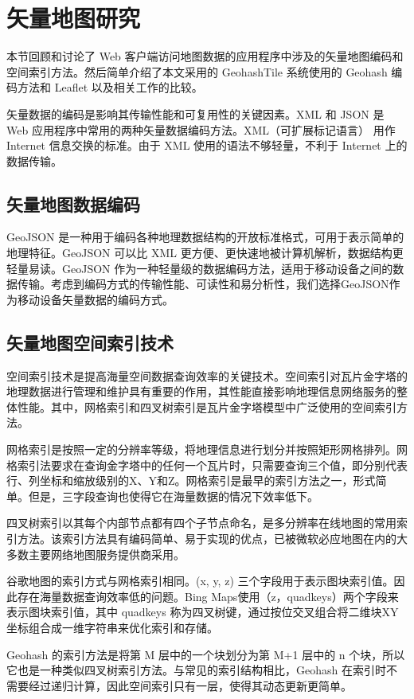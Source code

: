 \section{矢量地图研究}
本节回顾和讨论了 Web 客户端访问地图数据的应用程序中涉及的矢量地图编码和空间索引方法。然后简单介绍了本文采用的 GeohashTile 系统使用的 Geohash 编码方法和 Leaflet 以及相关工作的比较。

矢量数据的编码是影响其传输性能和可复用性的关键因素。XML 和 JSON 是 Web 应用程序中常用的两种矢量数据编码方法。XML（可扩展标记语言） 用作 Internet 信息交换的标准。由于 XML 使用的语法不够轻量，不利于 Internet 上的数据传输。\par
\subsection{矢量地图数据编码}
GeoJSON 是一种用于编码各种地理数据结构的开放标准格式，可用于表示简单的地理特征。GeoJSON 可以比 XML 更方便、更快速地被计算机解析，数据结构更轻量易读。GeoJSON 作为一种轻量级的数据编码方法，适用于移动设备之间的数据传输。考虑到编码方式的传输性能、可读性和易分析性，我们选择GeoJSON作为移动设备矢量数据的编码方式。

\subsection{矢量地图空间索引技术}
空间索引技术是提高海量空间数据查询效率的关键技术。空间索引对瓦片金字塔的地理数据进行管理和维护具有重要的作用，其性能直接影响地理信息网络服务的整体性能。其中，网格索引和四叉树索引是瓦片金字塔模型中广泛使用的空间索引方法。\par
网格索引是按照一定的分辨率等级，将地理信息进行划分并按照矩形网格排列。网格索引法要求在查询金字塔中的任何一个瓦片时，只需要查询三个值，即分别代表行、列坐标和缩放级别的X、Y和Z。网格索引是最早的索引方法之一，形式简单。但是，三字段查询也使得它在海量数据的情况下效率低下。\par
四叉树索引以其每个内部节点都有四个子节点命名，是多分辨率在线地图的常用索引方法。该索引方法具有编码简单、易于实现的优点，已被微软必应地图在内的大多数主要网络地图服务提供商采用。\par
谷歌地图的索引方式与网格索引相同。(x, y, z) 三个字段用于表示图块索引值。因此存在海量数据查询效率低的问题。Bing Maps使用（z，quadkeys）两个字段来表示图块索引值，其中 quadkeys 称为四叉树键，通过按位交叉组合将二维块XY坐标组合成一维字符串来优化索引和存储。\par
Geohash 的索引方法是将第 M 层中的一个块划分为第 M+1 层中的 n 个块，所以它也是一种类似四叉树索引方法。与常见的索引结构相比，Geohash 在索引时不需要经过递归计算，因此空间索引只有一层，使得其动态更新更简单。

